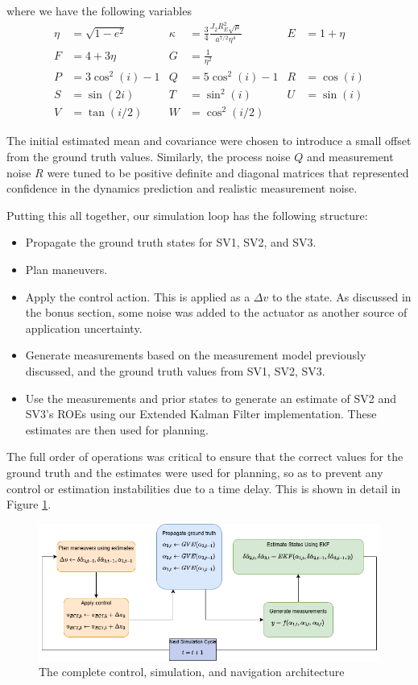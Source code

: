 where we have the following variables
\begin{align*}
\eta &= \sqrt{1 - e^2} &
\kappa &= \frac{3}{4} \frac{J_2 R_E^2 \sqrt{\mu}}{a^{7/2} \eta^4} &
E &= 1 + \eta \\
F &= 4 + 3\eta &
G &= \frac{1}{\eta^2} & \\
P &= 3\cos^2(i) - 1 &
Q &= 5\cos^2(i) - 1 &
R &= \cos(i) \\
S &= \sin(2i) &
T &= \sin^2(i) &
U &= \sin(i) \\
V &= \tan(i/2) &
W &= \cos^2(i/2)
\end{align*} 

The initial estimated mean and covariance were chosen to introduce a small offset from the ground truth values. Similarly, the process noise $Q$ and measurement noise $R$ were tuned to be positive definite and diagonal matrices that represented confidence in the dynamics prediction and realistic measurement noise. 

Putting this all together, our simulation loop has the following structure:
\begin{itemize}
    \item Propagate the ground truth states for SV1, SV2, and SV3. 
    \item Plan maneuvers. 
    \item Apply the control action. This is applied as a $\Delta v$ to the state. As discussed in the bonus section, some noise was added to the actuator as another source of application uncertainty.
    \item Generate measurements based on the measurement model previously discussed, and the ground truth values from SV1, SV2, SV3.
    \item Use the measurements and prior states to generate an estimate of SV2 and SV3's ROEs using our Extended Kalman Filter implementation. These estimates are then used for planning.
\end{itemize}

The full order of operations was critical to ensure that the correct values for the ground truth and the estimates were used for planning, so as to prevent any control or estimation instabilities due to a time delay. This is shown in detail in Figure \ref{fig:nav_control_arch_summary}.

\begin{figure}[H]
    \centering
    \includegraphics[width=0.85\linewidth]{LaTeX/PS9/soss_control_nav_arch.png}
    \caption{The complete control, simulation, and navigation architecture}
    \label{fig:nav_control_arch_summary}
\end{figure}

